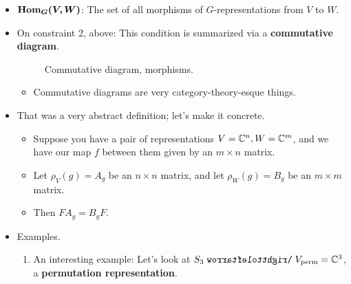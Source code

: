\documentclass[../notes.tex]{subfiles}
\begin{document}
\begin{itemize}
\begin{enumerate}
        \item $f$ is linear;
        \item $f$ respects the structure of the representations; explicitly, for every $g\in G$, $\rho_V(g)\circ f=f\circ\rho_W(g)$\footnote{Recall that the object, $\rho_V(g)$ is a linear map! Thus, it can be composed with other linear maps like $f$.}.
    \end{enumerate}
    \item $\bm{\Hom_G(V,W)}$: The set of all morphisms of $G$-representations from $V$ to $W$.
    \item On constraint 2, above: This condition is summarized via a \textbf{commutative diagram}.
    \begin{figure}[h!]
        \centering
        \DisableQuotes
        \EnableQuotes
        \vspace{-1.5em}
        \caption{Commutative diagram, morphisms.}
        \label{fig:CDmorphisms}
    \end{figure}
    \begin{itemize}
        \item Commutative diagrams are very category-theory-esque things.
    \end{itemize}
    \item That was a very abstract definition; let's make it concrete.
    \begin{itemize}
        \item Suppose you have a pair of representations $V=\mathbb{C}^n,W=\mathbb{C}^m$, and we have our map $f$ between them given by an $m\times n$ matrix.
        \item Let $\rho_V(g)=A_g$ be an $n\times n$ matrix, and let $\rho_W(g)=B_g$ be an $m\times m$ matrix.
        \item Then $FA_g=B_gF$.
    \end{itemize}
    \item Examples.
    \begin{enumerate}
        \item An interesting example: Let's look at $S_3\acts V_\text{perm}=\C^3$, a \textbf{permutation representation}.

\end{enumerate}
\end{itemize}
\end{document}
